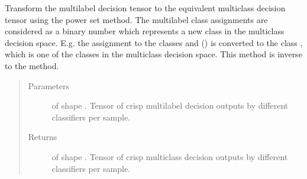 \documentclass[letterpaper,10pt,english]{sphinxmanual}
\begin{document}
\begin{fulllineitems}
\label{\detokenize{pusion.util.transformer:pusion.util.transformer.multilabel_to_multiclass_assignments}}
\sphinxAtStartPar
Transform the multilabel decision tensor to the equivalent multiclass decision tensor using the power set method.
The multilabel class assignments are considered as a binary number which represents a new class in the
multiclass decision space. E.g. the assignment to the classes  and  (\sphinxtitleref{{[}1,0,1{]}}) is converted to the class ,
which is one of the  classes in the multiclass decision space.
This method is inverse to the  method.
\begin{quote}\begin{description}
\item[{Parameters}] \leavevmode
\sphinxAtStartPar
{} \textendash{}  of shape .
Tensor of crisp multilabel decision outputs by different classifiers per sample.

\item[{Returns}] \leavevmode
\sphinxAtStartPar
{} of shape .
Tensor of crisp multiclass decision outputs by different classifiers per sample.

\end{description}\end{quote}

\end{fulllineitems}

\end{document}

